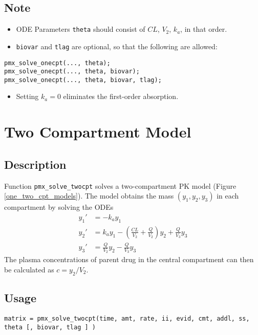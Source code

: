 \documentclass[12pt, reqno, oneside]{amsbook}
\numberwithin{equation}{chapter}
\numberwithin{figure}{chapter}
\numberwithin{table}{chapter}
\theoremstyle{remark}
\begin{document}
\subsection{Note}
\label{sec:org83e8503}
\begin{itemize}
\item ODE Parameters \texttt{theta} should consist of \(CL\), \(V_2\), \(k_a\), in that order.
\item \texttt{biovar} and \texttt{tlag} are optional, so that the following are allowed:
\end{itemize}
\begin{verbatim}
pmx_solve_onecpt(..., theta);
pmx_solve_onecpt(..., theta, biovar);
pmx_solve_onecpt(..., theta, biovar, tlag);
\end{verbatim}
\begin{itemize}
\item Setting \(k_a = 0\) eliminates the first-order absorption.
\end{itemize}

\section{Two Compartment Model}
\label{sec:orgc2ace93}
\subsection{Description}
\label{sec:org8e248ad}
Function \texttt{pmx\_solve\_twocpt} solves a two-compartment PK
model (Figure \ref{one_two_cpt_models}). The model obtains the mass \((y_1, y_2, y_3)\) in each compartment
by solving the ODEs
\begin{align} \label{eq:twocpt}
  y_1' &= -k_a y_1 \\
  y_2' &= k_a y_1 - \left(\frac{CL}{V_2} + \frac{Q}{V_2}\right) y_2 +  \frac{Q}{V_3}  y_3  \\
  y_3' &= \frac{Q}{V_2} y_2 - \frac{Q}{V_3} y_3
\end{align}
The plasma concentrations of parent drug in the central compartment
can then be calculated as \(c=y_2/V_2\).

\subsection{Usage}
\label{sec:org38737c1}
\begin{verbatim}
matrix = pmx_solve_twocpt(time, amt, rate, ii, evid, cmt, addl, ss, theta [, biovar, tlag ] )
\end{verbatim}
\end{document}
